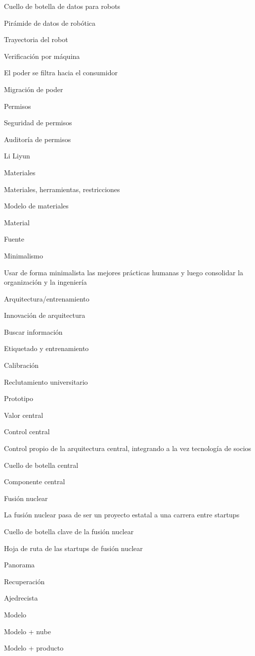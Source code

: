 \documentclass{article}
\begin{document}
Cuello de botella de datos para robots

Pirámide de datos de robótica

Trayectoria del robot

Verificación por máquina

El poder se filtra hacia el consumidor

Migración de poder

Permisos

Seguridad de permisos

Auditoría de permisos

Li Liyun

Materiales

Materiales, herramientas, restricciones

Modelo de materiales

Material

Fuente

Minimalismo

Usar de forma minimalista las mejores prácticas humanas y luego consolidar la organización y la ingeniería

Arquitectura/entrenamiento

Innovación de arquitectura

Buscar información

Etiquetado y entrenamiento

Calibración

Reclutamiento universitario

Prototipo

Valor central

Control central

Control propio de la arquitectura central, integrando a la vez tecnología de socios

Cuello de botella central

Componente central

Fusión nuclear

La fusión nuclear pasa de ser un proyecto estatal a una carrera entre startups

Cuello de botella clave de la fusión nuclear

Hoja de ruta de las startups de fusión nuclear

Panorama

Recuperación

Ajedrecista

Modelo

Modelo + nube

Modelo + producto
\end{document}
